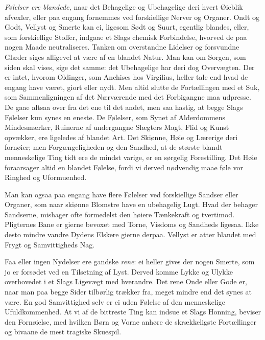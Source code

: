 \documentclass[12pt,a4paper]{article}
\newcommand{\opage}[1]{\marginnote{\footnotesize\textit{[#1]}}}
\begin{document}
\opage{194} \emph{Følelser ere blandede,} naar det Behagelige og Ubehagelige deri hvert Øieblik
afvexler, eller paa engang fornemmes ved forskiellige Nerver og Organer. Ondt og Godt,
Vellyst og Smerte kan ei, ligesom Sødt og Suurt, egentlig blandes, eller, som forskiellige
Stoffer, indgaae et Slags chemisk Forbindelse, hvorved de paa nogen Maade neutraliseres.
Tanken om overstandne Lidelser og forsvundne Glæder siges alligevel at være af en blandet
Natur. Man kan om Sorgen, som siden skal vises, sige det samme: det Ubehagelige har deri
dog Overvægten. Der er intet, hvorom Oldinger, som Anchises hos Virgilius, heller tale end
hvad de engang have været, giort eller nydt. Men altid slutte de Fortællingen med et Suk,
som Sammenligningen af det Nærværende med det Forbigangne maa udpresse. De gaae altsaa
over fra det ene til det andet, men saa hastig, at begge Slags Følelser kun synes en
eneste. De Følelser, som Synet af Alderdommens Mindesmærker, Ruinerne af undergangne
Slægters Magt, Flid og Kunst opvækker, ere ligeledes af blandet Art. Det Skiønne, Høie og
Lærerige deri fornøier; men Forgængeligheden og den Sandhed, at de største blandt
menneskelige Ting tidt ere de mindst varige, er en sørgelig Forestilling. Det Høie
foraarsager altid en blandet Følelse, fordi vi derved nødvendig maae føle vor Ringhed og
Uformuenhed.

\opage{195} Man kan ogsaa paa engang have flere Følelser ved forskiellige Sandser eller Organer, som
naar skiønne Blomstre have en ubehagelig Lugt. Hvad der behager Sandserne, mishager ofte
formedelst den høiere Tænkekraft og tvertimod. Pligternes Bane er gierne bevoxet med
Torne, Visdoms og Sandheds ligesaa. Ikke desto mindre vandre Dydens Elskere gierne derpaa.
Vellyst er atter blandet med Frygt og Samvittigheds Nag.

Faa eller ingen Nydelser ere gandske \emph{rene}: ei heller gives der nogen Smerte, som jo
er forsødet ved en Tilsetning af Lyst. Derved komme Lykke og Ulykke overhovedet i et Slags
Ligevægt med hverandre. Det rene Onde eller Gode er, naar man paa begge Sider tilbørlig
trækker fra, meget mindre end det synes at være. En god Samvittighed selv er ei uden
Følelse af den menneskelige Ufuldkommenhed. At vi af de bittreste Ting kan indsue et Slags
Honning, beviser den Fornøielse, med hvilken Børn og Vorne anhøre de skrækkeligste
Fortællinger og bivaane de mest tragiske Skuespil.
\end{document}
